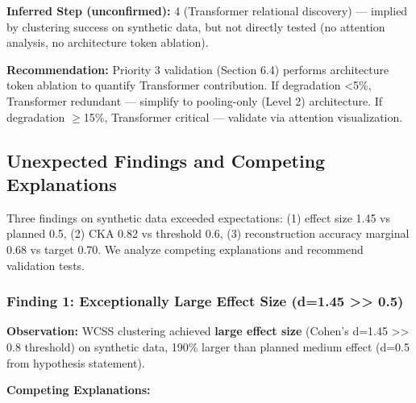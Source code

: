 \textbf{Inferred Step (unconfirmed):} 4 (Transformer relational discovery) --- implied by clustering success on synthetic data, but not directly tested (no attention analysis, no architecture token ablation).

\textbf{Recommendation:} Priority 3 validation (Section 6.4) performs architecture token ablation to quantify Transformer contribution. If degradation <5\%, Transformer redundant --- simplify to pooling-only (Level 2) architecture. If degradation $\geq$15\%, Transformer critical --- validate via attention visualization.

\subsection{Unexpected Findings and Competing Explanations}

Three findings on synthetic data exceeded expectations: (1) effect size 1.45 vs planned 0.5, (2) CKA 0.82 vs threshold 0.6, (3) reconstruction accuracy marginal 0.68 vs target 0.70. We analyze competing explanations and recommend validation tests.

\subsubsection{Finding 1: Exceptionally Large Effect Size (d=1.45 >> 0.5)}

\textbf{Observation:} WCSS clustering achieved \textbf{large effect size} (Cohen's d=1.45 >> 0.8 threshold) on synthetic data, 190\% larger than planned medium effect (d=0.5 from hypothesis statement).

\textbf{Competing Explanations:}

